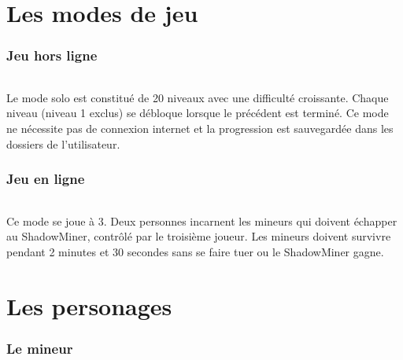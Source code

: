 \documentclass[titlepage, 13px, a4paper]{report}
\begin{document}

\newpage


\part{Les modes de jeu} 

\section{Jeu hors ligne}
\paragraph*{} \hspace{0pt}
Le mode solo est constitué de 20 niveaux avec une difficulté croissante. 
Chaque niveau (niveau 1 exclus) se débloque lorsque le précédent est terminé. 
Ce mode ne nécessite pas de connexion internet et la progression est sauvegardée dans les dossiers de l'utilisateur. \\

\section{Jeu en ligne} 
\paragraph*{} \hspace{0pt}
Ce mode se joue à 3. Deux personnes incarnent les mineurs qui doivent échapper au ShadowMiner, 
contrôlé par le troisième joueur. Les mineurs doivent survivre pendant 2 minutes et 30 secondes 
sans se faire tuer ou le ShadowMiner gagne. \\


\newpage


\part{Les personages} 

\section{Le mineur}
\end{document}
